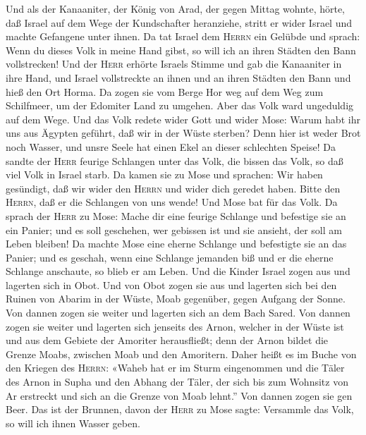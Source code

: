  Und als der Kanaaniter, der König von Arad, der gegen
Mittag wohnte, hörte, daß Israel auf dem Wege der Kundschafter
heranziehe, stritt er wider Israel und machte Gefangene unter ihnen.
 Da tat Israel dem \textsc{Herrn} ein Gelübde und sprach:
Wenn du dieses Volk in meine Hand gibst, so will ich an ihren Städten
den Bann vollstrecken!  Und der \textsc{Herr} erhörte
Israels Stimme und gab die Kanaaniter in ihre Hand, und Israel
vollstreckte an ihnen und an ihren Städten den Bann und hieß den Ort
Horma.  Da zogen sie vom Berge Hor weg auf dem Weg zum
Schilfmeer, um der Edomiter Land zu umgehen. Aber das Volk ward
ungeduldig auf dem Wege.  Und das Volk redete wider Gott
und wider Mose: Warum habt ihr uns aus Ägypten geführt, daß wir in der
Wüste sterben? Denn hier ist weder Brot noch Wasser, und unsre Seele hat
einen Ekel an dieser schlechten Speise!  Da sandte der
\textsc{Herr} feurige Schlangen unter das Volk, die bissen das Volk, so
daß viel Volk in Israel starb.  Da kamen sie zu Mose und
sprachen: Wir haben gesündigt, daß wir wider den \textsc{Herrn} und
wider dich geredet haben. Bitte den \textsc{Herrn}, daß er die Schlangen
von uns wende!  Und Mose bat für das Volk. Da sprach der
\textsc{Herr} zu Mose: Mache dir eine feurige Schlange und befestige sie
an ein Panier; und es soll geschehen, wer gebissen ist und sie ansieht,
der soll am Leben bleiben!  Da machte Mose eine eherne
Schlange und befestigte sie an das Panier; und es geschah, wenn eine
Schlange jemanden biß und er die eherne Schlange anschaute, so blieb er
am Leben.  Und die Kinder Israel zogen aus und lagerten
sich in Obot.  Und von Obot zogen sie aus und lagerten
sich bei den Ruinen von Abarim in der Wüste, Moab gegenüber, gegen
Aufgang der Sonne.  Von dannen zogen sie weiter und
lagerten sich an dem Bach Sared.  Von dannen zogen sie
weiter und lagerten sich jenseits des Arnon, welcher in der Wüste ist
und aus dem Gebiete der Amoriter herausfließt; denn der Arnon bildet die
Grenze Moabs, zwischen Moab und den Amoritern.  Daher
heißt es im Buche von den Kriegen des \textsc{Herrn}: «Waheb hat er im
Sturm eingenommen und die Täler des Arnon in Supha  und
den Abhang der Täler, der sich bis zum Wohnsitz von Ar erstreckt und
sich an die Grenze von Moab lehnt.''  Von dannen zogen
sie gen Beer. Das ist der Brunnen, davon der \textsc{Herr} zu Mose
sagte: Versammle das Volk, so will ich ihnen Wasser geben.
